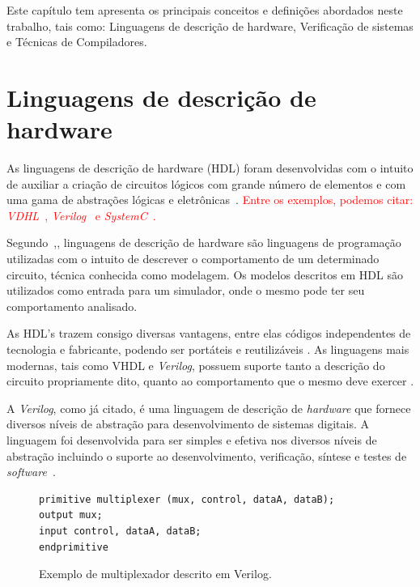 \label{chapter:conceitos}
Este capítulo tem apresenta os principais conceitos e definições abordados neste trabalho, tais como: Linguagens de descrição de hardware, Verificação de sistemas e Técnicas de Compiladores.

\section{Linguagens de descrição de hardware}

As linguagens de descrição de hardware (HDL) foram desenvolvidas com o intuito de auxiliar a criação de circuitos lógicos com grande número de elementos e com uma gama de abstrações lógicas e eletrônicas~\cite{thomas2008verilog}. \textcolor{red}{Entre os exemplos, podemos citar: \textit{VDHL}~\cite{IEEEVHDLLanguage}, \textit{Verilog}~\cite{IEEEVerilogLanguage} e \textit{SystemC}~\cite{IEEESystemCLanguage}.}

\par
Segundo~\citeauthor{christen1999vhdl},\citeyear{christen1999vhdl}, linguagens de descrição de hardware são linguagens de programação utilizadas com o intuito de descrever o comportamento de um determinado circuito, técnica conhecida como modelagem. Os modelos descritos em HDL são utilizados como entrada para um simulador, onde o mesmo pode ter seu comportamento analisado.

\par
As HDL's trazem consigo diversas vantagens, entre elas códigos independentes de tecnologia e fabricante, podendo ser portáteis e reutilizáveis \cite{cappelattipraticando}. As linguagens mais modernas, tais como VHDL e \textit{Verilog}, possuem suporte tanto a descrição do circuito propriamente dito, quanto ao comportamento que o mesmo deve exercer \cite{christen1999vhdl}.

\par
A \textit{Verilog}, como já citado, é uma linguagem de descrição de \textit{hardware} que fornece diversos níveis de abstração para desenvolvimento de sistemas digitais\cite{thomas2008verilog}. A linguagem foi desenvolvida para ser simples e efetiva nos diversos níveis de abstração incluindo o suporte ao desenvolvimento, verificação, síntese e testes de \textit{software}~\cite{IEEEVerilogLanguage}.

\begin{figure}[H]
\caption{\label{fig:mux_verilog} Exemplo de multiplexador descrito em Verilog.}
	\begin{center}
    \begin{minipage}{0.7\textwidth}
    \begin{lstlisting}       
primitive multiplexer (mux, control, dataA, dataB);
output mux;
input control, dataA, dataB;
endprimitive
\end{lstlisting}
    \end{minipage}
	\end{center}
\end{figure}

